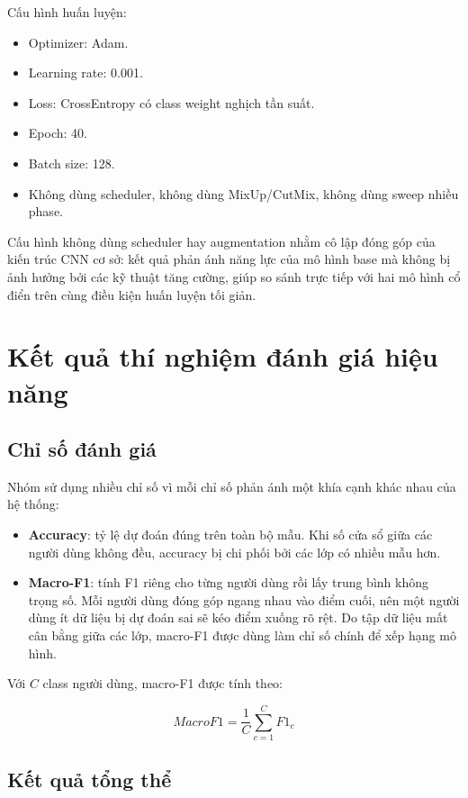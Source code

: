 \documentclass[12pt,a4paper]{article}
\begin{document}
Cấu hình huấn luyện:

\begin{itemize}
    \item Optimizer: Adam.
    \item Learning rate: 0.001.
    \item Loss: CrossEntropy có class weight nghịch tần suất.
    \item Epoch: 40.
    \item Batch size: 128.
    \item Không dùng scheduler, không dùng MixUp/CutMix, không dùng sweep nhiều phase.
\end{itemize}

Cấu hình không dùng scheduler hay augmentation nhằm cô lập đóng góp của kiến trúc CNN cơ sở: kết quả phản ánh năng lực của mô hình base mà không bị ảnh hưởng bởi các kỹ thuật tăng cường, giúp so sánh trực tiếp với hai mô hình cổ điển trên cùng điều kiện huấn luyện tối giản.

\section{Kết quả thí nghiệm đánh giá hiệu năng}

\subsection{Chỉ số đánh giá}

Nhóm sử dụng nhiều chỉ số vì mỗi chỉ số phản ánh một khía cạnh khác nhau của hệ thống:

\begin{itemize}
    \item \textbf{Accuracy}: tỷ lệ dự đoán đúng trên toàn bộ mẫu. Khi số cửa sổ giữa các người dùng không đều, accuracy bị chi phối bởi các lớp có nhiều mẫu hơn.
    \item \textbf{Macro-F1}: tính F1 riêng cho từng người dùng rồi lấy trung bình không trọng số. Mỗi người dùng đóng góp ngang nhau vào điểm cuối, nên một người dùng ít dữ liệu bị dự đoán sai sẽ kéo điểm xuống rõ rệt. Do tập dữ liệu mất cân bằng giữa các lớp, macro-F1 được dùng làm chỉ số chính để xếp hạng mô hình.
\end{itemize}

Với \(C\) class người dùng, macro-F1 được tính theo:

\[
MacroF1 = \frac{1}{C}\sum_{c=1}^{C} F1_c
\]

\subsection{Kết quả tổng thể}
\end{document}
